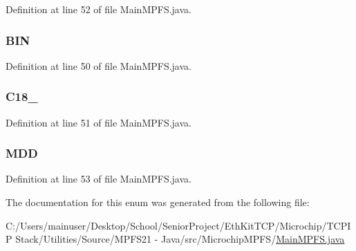 Definition at line 52 of file Main\+M\+P\+F\+S.\+java.

\hypertarget{enum_microchip_m_p_f_s_1_1_main_m_p_f_s_1_1output_file_format_a4cdf0b70265066d6127339b05fd497c1}{}
\subsubsection[{B\+I\+N}]{\setlength{\rightskip}{0pt plus 5cm}B\+I\+N}\label{enum_microchip_m_p_f_s_1_1_main_m_p_f_s_1_1output_file_format_a4cdf0b70265066d6127339b05fd497c1}


Definition at line 50 of file Main\+M\+P\+F\+S.\+java.

\hypertarget{enum_microchip_m_p_f_s_1_1_main_m_p_f_s_1_1output_file_format_af92ad03ebcc6a8347c29fee541e44b17}{}
\subsubsection[{C18\+\_\+32}]{\setlength{\rightskip}{0pt plus 5cm}C18\+\_}\label{enum_microchip_m_p_f_s_1_1_main_m_p_f_s_1_1output_file_format_af92ad03ebcc6a8347c29fee541e44b17}


Definition at line 51 of file Main\+M\+P\+F\+S.\+java.

\hypertarget{enum_microchip_m_p_f_s_1_1_main_m_p_f_s_1_1output_file_format_a243d004bf4bcbc53e81b2d5fecfe17b8}{}
\subsubsection[{M\+D\+D}]{\setlength{\rightskip}{0pt plus 5cm}M\+D\+D}\label{enum_microchip_m_p_f_s_1_1_main_m_p_f_s_1_1output_file_format_a243d004bf4bcbc53e81b2d5fecfe17b8}


Definition at line 53 of file Main\+M\+P\+F\+S.\+java.



The documentation for this enum was generated from the following file\+:\begin{DoxyCompactItemize}
\item 
C\+:/\+Users/mainuser/\+Desktop/\+School/\+Senior\+Project/\+Eth\+Kit\+T\+C\+P/\+Microchip/\+T\+C\+P\+I\+P Stack/\+Utilities/\+Source/\+M\+P\+F\+S21 -\/ Java/src/\+Microchip\+M\+P\+F\+S/\hyperlink{_main_m_p_f_s_8java}{Main\+M\+P\+F\+S.\+java}\end{DoxyCompactItemize}
